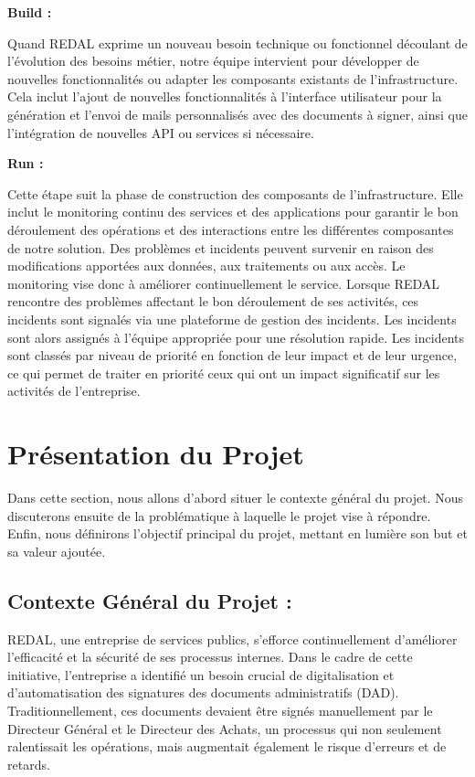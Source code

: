 \textbf{Build :}

Quand REDAL exprime un nouveau besoin technique ou fonctionnel découlant de l’évolution des besoins métier, notre équipe intervient pour développer de nouvelles fonctionnalités ou adapter les composants existants de l’infrastructure. Cela inclut l’ajout de nouvelles fonctionnalités à l’interface utilisateur pour la génération et l’envoi de mails personnalisés avec des documents à signer, ainsi que l’intégration de nouvelles API ou services si nécessaire.

\textbf{Run :}

Cette étape suit la phase de construction des composants de l’infrastructure. Elle inclut le monitoring continu des services et des applications pour garantir le bon déroulement des opérations et des interactions entre les différentes composantes de notre solution. Des problèmes et incidents peuvent survenir en raison des modifications apportées aux données, aux traitements ou aux accès. Le monitoring vise donc à améliorer continuellement le service. Lorsque REDAL rencontre des problèmes affectant le bon déroulement de ses activités, ces incidents sont signalés via une plateforme de gestion des incidents. Les incidents sont alors assignés à l’équipe appropriée pour une résolution rapide. Les incidents sont classés par niveau de priorité en fonction de leur impact et de leur urgence, ce qui permet de traiter en priorité ceux qui ont un impact significatif sur les activités de l’entreprise.


\newpage
\section{Présentation du Projet}
\quad Dans cette section, nous allons d’abord situer le contexte général du projet. Nous discuterons ensuite de la problématique à laquelle le projet vise à répondre. Enfin, nous définirons l’objectif principal du projet, mettant en lumière son but et sa valeur ajoutée.

\subsection{Contexte Général du Projet :}

REDAL, une entreprise de services publics, s'efforce continuellement d'améliorer l'efficacité et la sécurité de ses processus internes. Dans le cadre de cette initiative, l'entreprise a identifié un besoin crucial de digitalisation et d'automatisation des signatures des documents administratifs (DAD). Traditionnellement, ces documents devaient être signés manuellement par le Directeur Général et le Directeur des Achats, un processus qui non seulement ralentissait les opérations, mais augmentait également le risque d'erreurs et de retards.


